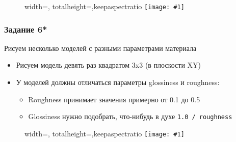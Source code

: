 \documentclass{beamer}
\newcommand{\slideimage}[1]{
  \begin{figure}
    \begin{adjustbox}{width=\textwidth, totalheight=\textheight-2\baselineskip-2\baselineskip,keepaspectratio}
      \texttt{[image: \#1]}
    \end{adjustbox}
  \end{figure}
}
\begin{document}
\begin{frame}[fragile]
\slideimage{5.png}
\end{frame}

\begin{frame}[fragile]
\frametitle{Задание 6*}
Рисуем несколько моделей с разными параметрами материала
\begin{itemize}
\item Рисуем модель девять раз квадратом 3x3 (в плоскости XY)
\item У моделей должны отличаться параметры glossiness и roughness:
\begin{itemize}
\item Roughness принимает значения примерно от 0.1 до 0.5
\item Glossiness нужно подобрать, что-нибудь в духе \verb|1.0 / roughness|
\end{itemize}
\end{itemize}
\end{frame}

\begin{frame}[fragile]
\slideimage{6.png}
\end{frame}
\end{document}
